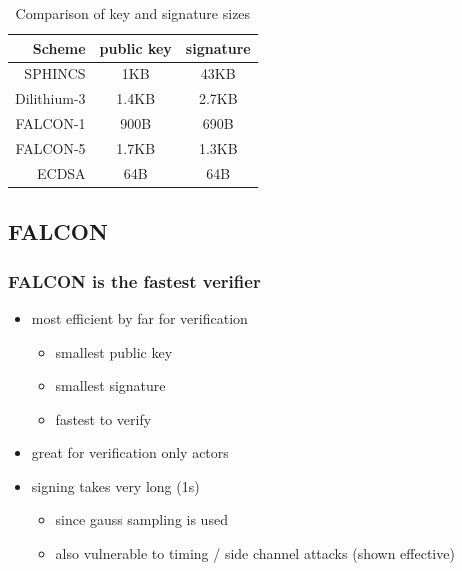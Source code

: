 \documentclass[ucs,10pt]{beamer}
\begin{document}
\begin{frame}[allowframebreaks]
\begin{table}%
    \caption{Comparison of key and signature sizes}
    \label{t:key_sig_comp}
    \centering\begin{tabular}{ | r | c c | }
        \hline
        Scheme & public key & signature \\
        \hline
        SPHINCS     & 1KB   & 43KB \\
        Dilithium-3 & 1.4KB & 2.7KB\\
        FALCON-1    & 900B  & 690B\\
        FALCON-5    & 1.7KB & 1.3KB\\
        \hline
        ECDSA       & 64B   & 64B\\
        \hline
    \end{tabular}
\end{table}

\end{frame}

\subsection{FALCON}
\begin{frame}
  \frametitle{FALCON is the fastest verifier}

  \begin{itemize}
    \item most efficient by far for verification 
    \begin{itemize}
      \item smallest public key
      \item smallest signature
      \item fastest to verify
    \end{itemize}
    \item great for verification only actors
    \item signing takes very long (1s)
    \begin{itemize}
      \item since gauss sampling is used
      \item also vulnerable to timing / side channel attacks (shown effective)
    \end{itemize}
  \end{itemize}

\end{frame}
\end{document}
